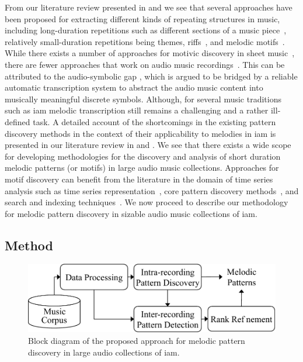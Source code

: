 From our literature review presented in  and  we see that several approaches have been proposed for extracting different kinds of repeating structures in music, including long-duration repetitions such as different sections of a music piece~\citep{serra2012unsupervised,Goto06TASLP, paulus2010state}, relatively small-duration repetitions being themes, riffs~\citep{Hsu2001a}, and melodic motifs~\citep{meredith2002algorithms,collins2011improved,Janssen2013}. While there exists a number of approaches for motivic discovery in sheet music~\citep{meredith2002algorithms,Cambouropoulos2006,conklin2001representation,Lartillot2005}, there are fewer approaches that work on audio music recordings~\citep{dannenberg2003pattern}. This can be attributed to the audio-symbolic gap \citep{collins2014bridging}, which is argued to be bridged by a reliable automatic transcription system to abstract the audio music content into musically meaningful discrete symbols. Although, for several music traditions such as \gls{iam} melodic transcription still remains a challenging and a rather ill-defined task. A detailed account of the shortcomings in the existing pattern discovery methods in the context of their applicability to melodies in \gls{iam} is presented in our literature review in  and . We see that there exists a wide scope for developing methodologies for the discovery and analysis of short duration melodic patterns (or motifs) in large audio music collections. Approaches for motif discovery can benefit from the literature in the domain of time series analysis such as time series representation~\citep{Lin2003}, core pattern discovery methods~\citep{Mueen2009}, and search and indexing techniques~\citep{Rakthanmanon2013}. We now proceed to describe our methodology for melodic pattern discovery in sizable audio music collections of \gls{iam}.


\subsection{Method}
\label{sec:patterns_discovery_method}

\begin{figure}
	\begin{center}
		\includegraphics[width=\figSizeEightyFive]{ch06_patterns/figures/discovery/blockDiagram_Overall.pdf}
	\end{center}
	\caption[Block diagram for melodic pattern discovery]{Block diagram of the proposed approach for melodic pattern discovery in large audio collections of \gls{iam}.}
	\label{fig:pattern_discovery_overall_block_diagram}
\end{figure}

